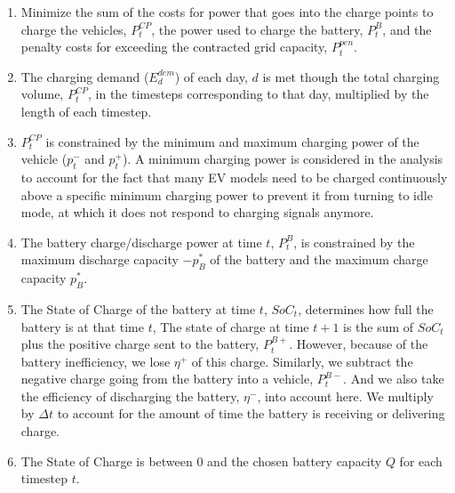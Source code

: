 \documentclass{article}
\begin{document}
\begin{enumerate}[(1)]
      \item[(1)] Minimize the sum of the costs for power that goes into the charge points to charge the vehicles, $P^{CP}_t$,
            the power used to charge the battery, $P^{B}_t$, and the penalty costs for exceeding the contracted grid capacity, $P^{pen}_t$.

      \item[(2)] The charging demand ($E^{dem}_d$) of each day, $d$ is met though the total charging volume, $P^{CP}_t$,
            in the timesteps corresponding to that day, multiplied by the length of each timestep.

      \item[(3--4)] $P^{CP}_t$ is constrained by the minimum and maximum charging power of the vehicle ($p^-_{t}$ and $p^+_{t}$).
            A minimum charging power is considered in the analysis to account for the fact that many EV models
            need to be charged continuously above a specific minimum charging power to prevent it from turning to idle mode,
            at which it does not respond to charging signals anymore.

      \item[(5--8)] The battery charge/discharge power at time $t$, $P^{B}_{t}$,
            is constrained by the maximum discharge capacity $- p^{*}_B$ of the battery
            and the maximum charge capacity $p^{*}_B$.

      \item[(9)] The State of Charge of the battery at time $t$, $SoC_t$, determines how full the battery is at that time $t$,
            The state of charge at time $t+1$ is the sum of $SoC_t$ plus the positive charge sent to the battery, $P^{B+}_{t}$.
            However, because of the battery inefficiency, we lose $\eta^{+}$ of this charge. Similarly, we subtract the negative charge
            going from the battery into a vehicle, $P^{B-}_{t}$. And we also take the efficiency of discharging the battery, $\eta^{-}$,
            into account here. We multiply by $\Delta t$ to account for the amount of time the battery is receiving or delivering charge.

      \item[(10--11)] The State of Charge is between 0 and the chosen battery capacity $Q$ for each timestep $t$.


\end{enumerate}
\end{document}
